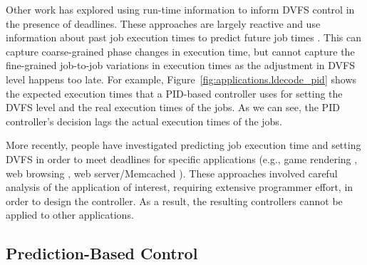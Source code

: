 Other work has explored using run-time information to inform DVFS control in
the presence of deadlines. These approaches are largely reactive and use
information about past job execution times to predict future job times
\cite{gu-dac08, choi-iccad02, pegasus-isca14, nachiappan-hpca15}. This can capture
coarse-grained phase changes in execution time, but cannot capture the
fine-grained job-to-job variations in execution times as the adjustment in DVFS
level happens too late.
For example, Figure~\ref{fig:applications.ldecode_pid} shows the expected
execution times that a PID-based controller uses for setting the DVFS level and
the real execution times of the jobs. As we can see, the PID controller's
decision lags the actual execution times of the jobs.

More recently, people have investigated predicting job execution time and
setting DVFS in order to meet deadlines for specific applications (e.g., game rendering \cite{gu-rtas08}, web
browsing \cite{zhu-hpca13, eqos-hpca15}, web server/Memcached
\cite{adrenaline-hpca15}). These approaches involved careful analysis of the
application of interest, requiring extensive programmer effort, in order to
design the controller. As a result, the resulting controllers cannot be applied
to other applications.

\subsection{Prediction-Based Control}

